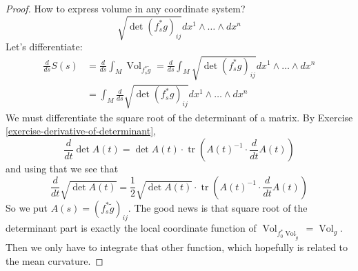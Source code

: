 \begin{proof}
How to express volume in any coordinate
system?
\[\sqrt{\det (f^*
_sg)_{ij}}dx^1\wedge\ldots\wedge dx^n\]
Let's differentiate:
$$
\begin{aligned}
\frac{d}{ds}S(s)&=\frac{d}{ds}
\int_M\operatorname{Vol}_{f^*_s\tilde{g}}
=\frac{d}{ds}\int_M \sqrt{\det (f^*
_sg)_{ij}}dx^1\wedge\ldots\wedge dx^n\\
&=\int_M \frac{d}{ds}\sqrt{\det (f^*
_sg)_{ij}}dx^1\wedge\ldots\wedge dx^n
\end{aligned}
$$
We must differentiate the square root of the
determinant of a matrix. By
Exercise
\ref{exercise-derivative-of-determinant},
$$
\frac{d}{dt}\det A(t)=
\det A(t) \cdot
\operatorname{tr}\left(A(t)^{-1}\cdot
\frac{d}{dt}A(t)\right)
$$
and using that we see that
$$
\frac{d}{dt}\sqrt{\det A(t)}
=\frac{1}{2}\sqrt{\det A(t)}
\cdot\operatorname{tr}\left(A(t)^{-1}\cdot
\frac{d}{dt}A(t)\right)
$$
So we put $A(s)=(f^*_s\tilde{g})_{ij}$. The
good news is that square root of the
determinant part is exactly the local
coordinate function of
$\operatorname{Vol}_{f_0^*\operatorname{Vol}
_{\tilde{g}}}=\operatorname{Vol}_g$.
Then we only have to integrate that other
function, which hopefully is related
to the mean curvature.


\end{proof}
